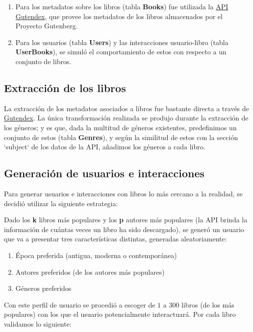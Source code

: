 \documentclass[14pt]{extarticle}
\begin{document}
\begin{enumerate}
    \item Para los metadatos sobre los libros (tabla \textbf{Books}) fue utilizada la \href{https://gutendex.com/}{API Gutendex}, que provee los metadatos de los libros almacenados por el Proyecto Gutenberg.
    \item Para los usuarios (tabla \textbf{Users}) y las interacciones usuario-libro (tabla \textbf{UserBooks}), se simuló el comportamiento de estos con respecto a un conjunto de libros.
\end{enumerate}

\subsection{Extracción de los libros}

La extracción de los metadatos asociados a libros fue bastante directa a través de  \href{https://gutendex.com/}{Gutendex}. La única transformación realizada se produjo durante la extracción de los géneros; y es que, dada la multitud de géneros existentes, predefinimos un conjunto de estos (tabla \textbf{Genres}), y según la similitud de estos con la sección `subject` de los datos de la API, añadimos los géneros a cada libro.

\subsection{Generación de usuarios e interacciones}

Para generar usuarios e interacciones con libros lo más cercano a la realidad, se decidió utilizar la siguiente estrategia:

Dado los \textbf{k} libros más populares y los \textbf{p} autores más populares (la API brinda la información de cuántas veces un libro ha sido descargado), se generó un usuario que va a presentar tres características distintas, generadas aleatoriamente:

\begin{enumerate}
    \item Época preferida (antigua, moderna o contemporánea)
    \item Autores preferidos (de los autores más populares)
    \item Géneros preferidos
\end{enumerate}

Con este perfil de usuario se procedió a escoger de $1$ a $300$ libros (de los más populares) con los que el usuario potencialmente interactuará. Por cada libro validamos lo siguiente:
\end{document}
